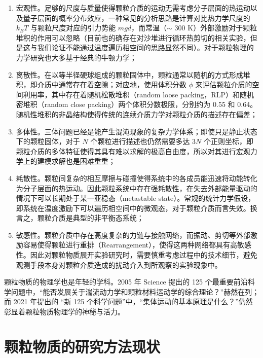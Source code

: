 \begin{enumerate}
  \item 宏观性。足够的尺度与质量使得颗粒介质的运动无需考虑分子层面的热运动以及量子层面的概率分布效应，一种常见的分析思路是计算对比热力学尺度的 $k_{B}T$ 与颗粒尺度对应的引力势能 $mgd$，而常温（$\sim$ 300 \unit{\kelvin}）外部激励对于颗粒堆积的作用可以忽略（目前也的确存在对沙堆进行循环热剪切的相关实验\cite{YIN2023100503}，但是这与我们论证不能通过温度遍历相空间的思路显然不同）。对于颗粒物理的力学研究也大多基于经典的牛顿力学；
  \item 离散性。在以等半径硬球组成的颗粒固体中，颗粒通常以随机的方式形成堆积，即介质中通常存在着空隙；对应地，使用体积分数 $\phi$ 来评估颗粒介质的空间利用率，其中存在着随机松散堆积（random loose packing，RLP）和随机密堆积（random close packing）两个体积分数极限，分别约为 0.55\cite{PhysRevLett.64.2727} 和 0.64\cite{RevModPhys.82.789}。随机性堆积的非晶结构使得传统的连续介质力学对颗粒介质的描述存在偏差\cite{RevModPhys.71.435}；
  \item 多体性。三体问题已经是能产生混沌现象的复杂力学体系；即使只是静止状态下的颗粒固体，对于 $N$ 个颗粒进行描述也仍然需要多达 $3N$ 个正则坐标，即颗粒介质的多体特征使得其具有难以求解的极高自由度，所以对其进行宏观力学上的建模求解也是困难重重；
  \item 耗散性。颗粒间复杂的相互摩擦与碰撞使得系统中的各成员能迅速将动能转化为分子层面的热运动。因此颗粒系统中存在强耗散性，在失去外部能量驱动的情况下可以长期处于某一亚稳态（metastable state）。常规的统计力学假设，即系统在温度激励下可以遍历相空间中的微观态，对于颗粒介质而言失效。换言之，颗粒介质是典型的非平衡态系统；
  \item 敏感性。颗粒介质中存在高度复杂的力链与接触网络，而振动、剪切等外部激励容易使得颗粒进行重排（Rearrangement），使得这两种网络都具有高敏感性。因此对颗粒物质展开实验研究时，需要慎重考虑过程中的技术细节，避免观测手段本身对颗粒介质造成的扰动介入到所观察的实验现象中。
\end{enumerate}

颗粒物质的物理学也是年轻的学科。2005 年 Science 提出的 125 个最重要前沿科学问题\cite{doi:10.1126/science.309.5731.78b}中，“能否发展关于湍流动力学和颗粒材料运动学的综合理论？”赫然在列；而 2021 年提出的 “新 125 个科学问题”\cite{sanders2021125}中，“集体运动的基本原理是什么？”仍然彰显着颗粒物质物理学的神秘与活力。

\section{颗粒物质的研究方法现状}


